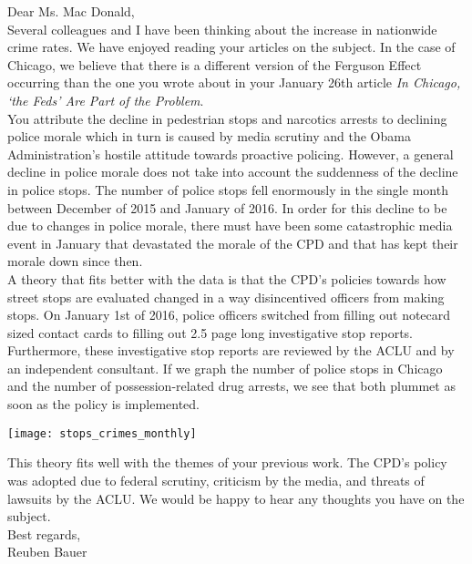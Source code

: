 \documentclass[]{article}
\begin{document}
\noindent Dear Ms. Mac Donald, \\

Several colleagues and I have been thinking about the increase in nationwide crime rates. We have enjoyed reading your articles on the subject. In the case of Chicago, we believe that there is a different version of the Ferguson Effect occurring than the one you wrote about in your January 26th article \textit{In Chicago, `the Feds' Are Part of the Problem}. \\

You attribute the decline in pedestrian stops and narcotics arrests to declining police morale which in turn is caused by media scrutiny and the Obama Administration's hostile attitude towards proactive policing. However, a general decline in police morale does not take into account the suddenness of the decline in police stops. The number of police stops fell enormously in the single month between December of 2015 and January of 2016. In order for this decline to be due to changes in police morale, there must have been some catastrophic media event in January that devastated the morale of the CPD and that has kept their morale down since then. \\

A theory that fits better with the data is that the CPD's policies towards how street stops are evaluated changed in a way disincentived officers from making stops. On January 1st of 2016, police officers switched from filling out notecard sized contact cards to filling out 2.5 page long investigative stop reports. Furthermore, these investigative stop reports are reviewed by the ACLU and by an independent consultant. If we graph the number of police stops in Chicago and the number of possession-related drug arrests, we see that both plummet as soon as the policy is implemented. 

\begin{center}
	\texttt{[image: stops\_crimes\_monthly]}
\end{center}

This theory fits well with the themes of your previous work. The CPD's policy was adopted due to federal scrutiny, criticism by the media, and threats of lawsuits by the ACLU. We would be happy to hear any thoughts you have on the subject. \\

Best regards, \\

Reuben Bauer
\end{document}
